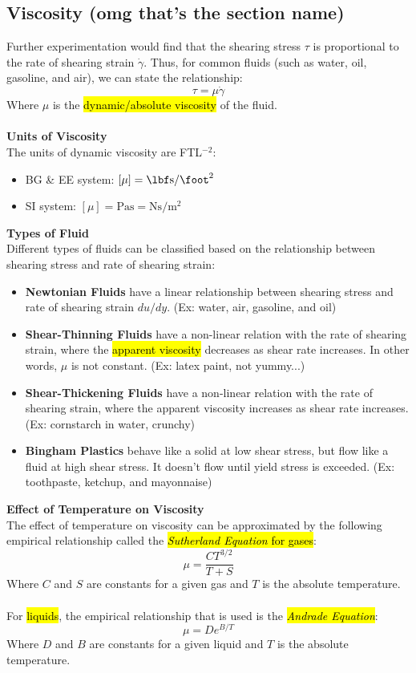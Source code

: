 ﻿\documentclass[12pt]{article}
\begin{document}
\subsection*{Viscosity (omg that's the section name)}
Further experimentation would find that the shearing stress $\tau$ is proportional to the rate of shearing strain $\dot{\gamma}$. Thus, for common fluids (such as water, oil, gasoline, and air), we can state the relationship:
\[\tau = \mu \dot{\gamma}\]
Where $\mu$ is the \hl{dynamic/absolute viscosity} of the fluid.\\\\
\textbf{Units of Viscosity}\\
The units of dynamic viscosity are FTL$^{-2}$:
\begin{itemize}
    \item BG \& EE system: $[\mu] = \unit{\lbf\second\per\foot\squared}$
    \item SI system: $[\mu] = \unit{\pascal\second} = \unit{\newton\second\per\meter\squared}$
\end{itemize}
\textbf{Types of Fluid}\\
Different types of fluids can be classified based on the relationship between shearing stress and rate of shearing strain:
\begin{itemize}
    \item \textbf{Newtonian Fluids} have a linear relationship between shearing stress and rate of shearing strain $du/dy$. (Ex: water, air, gasoline, and oil)
    \item \textbf{Shear-Thinning Fluids} have a non-linear relation with the rate of shearing strain, where the \hl{apparent viscosity} decreases as shear rate increases. In other words, $\mu$ is not constant. (Ex: latex paint, not yummy...)
    \item \textbf{Shear-Thickening Fluids} have a non-linear relation with the rate of shearing strain, where the apparent viscosity increases as shear rate increases. (Ex: cornstarch in water, crunchy)
    \item \textbf{Bingham Plastics} behave like a solid at low shear stress, but flow like a fluid at high shear stress. It doesn't flow until yield stress is exceeded. (Ex: toothpaste, ketchup, and mayonnaise) 
\end{itemize}
\textbf{Effect of Temperature on Viscosity}\\
The effect of temperature on viscosity can be approximated by the following empirical relationship called the \hl{\textit{Sutherland Equation} for gases}:
\[\mu = \frac{CT^{3/2}}{T+S}\]
Where $C$ and $S$ are constants for a given gas and $T$ is the absolute temperature.\\\\
For \hl{liquids}, the empirical relationship that is used is the \hl{\textit{Andrade Equation}}:
\[\mu = De^{B/T}\]
Where $D$ and $B$ are constants for a given liquid and $T$ is the absolute temperature.
\end{document}
